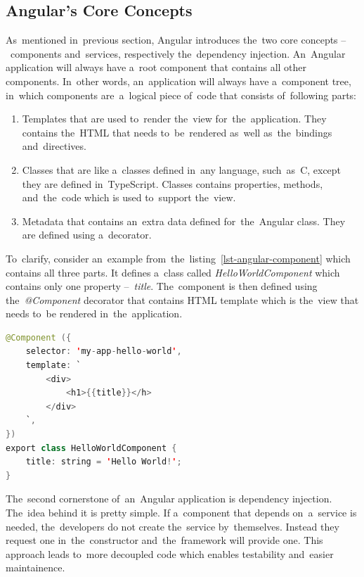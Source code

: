 \subsection{Angular's Core Concepts}
As~mentioned in~previous section, Angular introduces the~two core concepts
--~components and~services, respectively the~dependency injection. An~Angular
application will always have a~root component that contains all other
components. In~other words, an~application will always have a~component tree,
in~which components are~a~logical piece of~code that consists of~following
parts:

\begin{enumerate}
  \item Templates that are used to~render the~view for~the~application. They
  contains the~HTML that needs to~be~rendered as~well as~the~bindings
  and~directives.
  \item Classes that are like a~classes defined in~any language, such~as~C,
  except they are defined in~TypeScript. Classes contains properties, methods,
  and~the~code which is used to~support the~view.
  \item Metadata that contains an~extra data defined for~the~Angular class. They
  are defined using a~decorator.
\end{enumerate}

To~clarify, consider an~example from~the~listing~\ref{lst-angular-component}
which contains all three parts. It defines a~class called
\textit{HelloWorldComponent} which contains only one property --~\textit{title}.
The~component is then defined using the~\textit{@Component} decorator that
contains HTML template which is the~view that needs to~be rendered
in~the~application.

\begin{lstlisting}[caption=An~Angular class with~the~\textit{@Component}
decorator and~a~HTML template., label=lst-angular-component, style=dp-default,
language=Java]
@Component ({
	selector: 'my-app-hello-world',
	template: `
		<div>
			<h1>{{title}}</h>
		</div>
	`,
})
export class HelloWorldComponent {
	title: string = 'Hello World!';
}
\end{lstlisting}

The~second cornerstone of~an~Angular application is dependency injection.
The~idea behind it is pretty simple. If a~component that depends on~a~service is
needed, the~developers do not create the~service by~themselves. Instead they
request one in~the~constructor and~the~framework will provide one. This approach
leads to~more decoupled code which enables testability and~easier maintainence.

